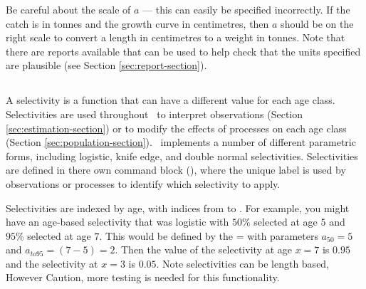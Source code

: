 Be careful about the scale of $a$ --- this can easily be specified incorrectly. If the catch is in tonnes and the growth curve in centimetres, then $a$ should be on the right scale to convert a length in centimetres to a weight in tonnes. Note that there are reports available that can be used to help check that the units specified are plausible (see Section \ref{sec:report-section}).


\subsubsection*{}

\subsection{\label{sec:weightless-model}}

\subsection{\label{sec:maturity-notinpartition}}

\newpage

\subsection{\label{sec:selectivities}}

A selectivity is a function that can have a different value for each age class. Selectivities are used throughout \CNAME\ to interpret observations (Section \ref{sec:estimation-section}) or to modify the effects of processes on each age class (Section \ref{sec:population-section}). \CNAME\ implements a number of different parametric forms, including logistic, knife edge, and double normal selectivities. Selectivities are defined in there own command block (), where the unique label is used by observations or processes to identify which selectivity to apply.

Selectivities are indexed by age, with indices from  to . For example, you might have an age-based selectivity that was logistic with $50\%$ selected at age $5$ and $95\%$ selected at age $7$. This would be defined by the = with parameters $a_{50}=5$ and $a_{to95}=(7-5)=2$. Then the value of the selectivity at age $x=7$ is $0.95$ and the selectivity at $x=3$ is $0.05$. Note selectivities can be length based, However Caution, more testing is needed for this functionality.


